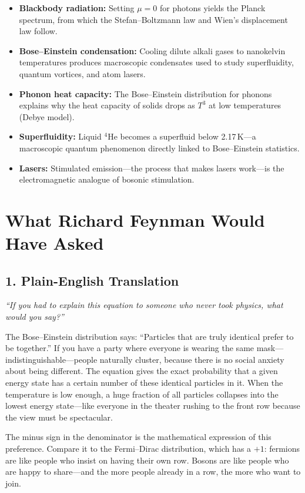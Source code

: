\begin{itemize}
\item \textbf{Blackbody radiation:} Setting $\mu = 0$ for photons yields the Planck spectrum, from which the Stefan--Boltzmann law and Wien's displacement law follow.
\item \textbf{Bose--Einstein condensation:} Cooling dilute alkali gases to nanokelvin temperatures produces macroscopic condensates used to study superfluidity, quantum vortices, and atom lasers.
\item \textbf{Phonon heat capacity:} The Bose--Einstein distribution for phonons explains why the heat capacity of solids drops as $T^3$ at low temperatures (Debye model).
\item \textbf{Superfluidity:} Liquid $^4$He becomes a superfluid below 2.17\,K---a macroscopic quantum phenomenon directly linked to Bose--Einstein statistics.
\item \textbf{Lasers:} Stimulated emission---the process that makes lasers work---is the electromagnetic analogue of bosonic stimulation.
\end{itemize}
\section*{What Richard Feynman Would Have Asked}

\subsection*{1. Plain-English Translation}
\textit{``If you had to explain this equation to someone who never took physics, what would you say?''}

The Bose--Einstein distribution says: ``Particles that are truly identical prefer to be together.'' If you have a party where everyone is wearing the same mask---indistinguishable---people naturally cluster, because there is no social anxiety about being different. The equation gives the exact probability that a given energy state has a certain number of these identical particles in it. When the temperature is low enough, a huge fraction of all particles collapses into the lowest energy state---like everyone in the theater rushing to the front row because the view must be spectacular.

The minus sign in the denominator is the mathematical expression of this preference. Compare it to the Fermi--Dirac distribution, which has a $+1$: fermions are like people who insist on having their own row. Bosons are like people who are happy to share---and the more people already in a row, the more who want to join.


